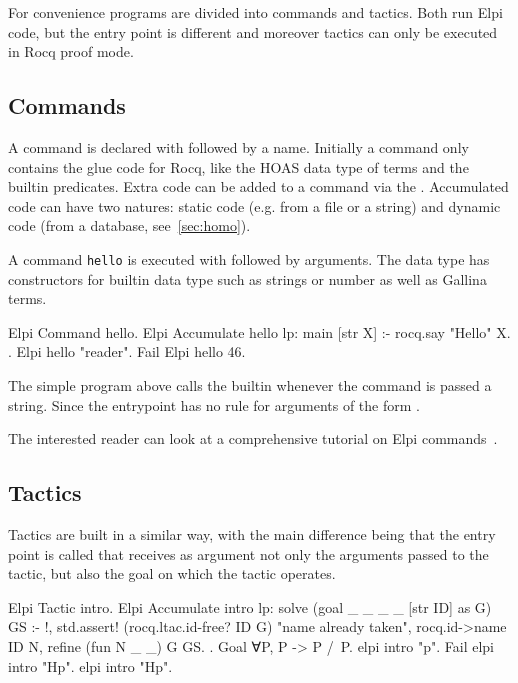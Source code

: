 \documentclass[a4paper, 11pt]{book}
\begin{document}
For convenience programs are divided into commands and tactics. Both run
Elpi code, but the entry point is different and moreover tactics can only
be executed in Rocq proof mode.

\subsection{Commands}

A command is declared with  followed by a name.
Initially a command only contains the glue code for Rocq, like the
HOAS data type of terms and the builtin predicates. Extra code
can be added to a command via the .
Accumulated code can have two natures: static code (e.g. from a file
or a string) and dynamic code (from a database, see~\ref{sec:homo}).

A command \texttt{hello} is executed with  followed
by arguments. The  data type has constructors
for builtin data type such as strings or number as well as Gallina terms.

\begin{rocqcode}
Elpi Command hello.
Elpi Accumulate hello lp:{{
  main [str X] :- rocq.say "Hello" X.
}}.
Elpi hello "reader".
Fail Elpi hello 46.
\end{rocqcode}

The simple program above calls the  builtin whenever the
command is passed a string. Since the entrypoint  has
no rule for arguments of the form .

The interested reader can look at a comprehensive tutorial on Elpi
commands~\cite{tuto:commands}.

\subsection{Tactics}

Tactics are built in a similar way, with the main difference being that
the entry point is called  that receives as
argument not only the arguments passed to the tactic, but also the goal
on which the tactic operates.

\begin{rocqcode}
Elpi Tactic intro.
Elpi Accumulate intro lp:{{
  solve (goal _ _ _ _ [str ID] as G) GS :- !,
    std.assert! (rocq.ltac.id-free? ID G) "name already taken",
    rocq.id->name ID N,
    refine (fun N _ _) G GS.
}}.
Goal ∀P, P -> P /\ P.
elpi intro "p".
Fail elpi intro "Hp".
elpi intro "Hp".
\end{rocqcode}
\end{document}
